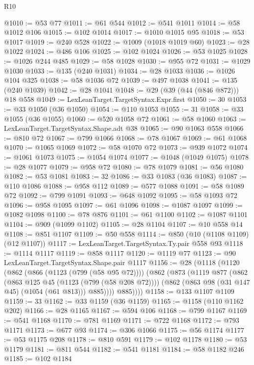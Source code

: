 \begin{lexlean}{R10}
\begin{coremodule}
@1010 := @53 @77
@1011 := @61 @544
@1012 := @541 @1011
@1014 := @58 @1012 @106
@1015 := @102 @1014
@1017 := @1010 @1015 @95
@1018 := @53 @1017
@1019 := @240 @528
@1022 := @1009 (@1018 @1019 @60)
@1023 := @28 @1022
@1024 := @486 @106
@1025 := @102 @1024
@1026 := @53 @1025
@1028 := @1026 @244 @485
@1029 := @58 @1028
@1030 := @955 @72
@1031 := @1029 @1030
@1033 := @135 (@240 @1031)
@1034 := @28 @1033
@1036 := @1026 @104 @325
@1038 := @58 @1036 @72
@1039 := @497 @1038
@1041 := @135 (@240 @1039)
@1042 := @28 @1041
@1048 := @29 (@39 (@44 (@846 @872))) @18 @558
@1049 := LexLeanTarget.TargetSyntax.Expr.first
@1050 := 30
@1053 := @33 @1050 (@36 @1050)
@1054 := @110 @1053
@1055 := 31
@1058 := @33 @1055 (@36 @1055)
@1060 := @520 @1058 @72
@1061 := @58 @1060
@1063 := LexLeanTarget.TargetSyntax.Shape.adt @38
@1065 := @90 @1063 @558
@1066 := @810 @72
@1067 := @799 @1066
@1068 := @78 @1067
@1069 := @61 @1068
@1070 := @1065 @1069
@1072 := @58 @1070 @72
@1073 := @939 @1072
@1074 := @1061 @1073
@1075 := @1054 @1074
@1077 := @1048 (@1049 @1075)
@1078 := @28 @1077
@1079 := @958 @72
@1080 := @78 @1079
@1081 := @56 @1080
@1082 := @53 @1081
@1083 := 32
@1086 := @33 @1083 (@36 @1083)
@1087 := @110 @1086
@1088 := @958 @112
@1089 := @577 @1088
@1091 := @58 @1089 @72
@1092 := @799 @1091
@1093 := @648 @1092
@1095 := @58 @1093 @72
@1096 := @958 @1095
@1097 := @61 @1096
@1098 := @1087 @1097
@1099 := @1082 @1098
@1100 := @78 @876
@1101 := @61 @1100
@1102 := @1087 @1101
@1104 := @909 (@1099 @1102)
@1105 := @28 @1104
@1107 := @10 @558 @14
@1108 := @851 @1107
@1109 := @50 @558
@1114 := @850 (@10 (@1108 @1109) (@12 @1107))
@1117 := LexLeanTarget.TargetSyntax.Ty.pair @558 @93
@1118 := @1114 @1117
@1119 := @858 @1117
@1120 := @1119 @77
@1123 := @90 LexLeanTarget.TargetSyntax.Shape.pair @1117
@1156 := @28
    (@1118
      (@1120
        (@862
          (@866 (@1123 (@799 (@58 @95 @72))))
          (@862
            (@873
              (@1119
                @877
                (@862
                  (@863 @125 @45 (@1123 (@799 (@58 @208 @72))))
                  (@862 (@863 @98 (@31 @147 @45) (@1054 (@61 @813))) @885))))
            @885))))
@1158 := @133 @1107 @1109
@1159 := 33
@1162 := @33 @1159 (@36 @1159)
@1165 := @1158 (@110 @1162 @202)
@1166 := @28 @1165
@1167 := @594 @106
@1168 := @799 @1167
@1169 := @541 @1168
@1170 := @781 @1169
@1171 := @722 @1168
@1172 := @793 @1171
@1173 := @677 @93
@1174 := @306 @1066
@1175 := @56 @1174
@1177 := @53 @1175 @208
@1178 := @810 @591
@1179 := @102 @1178
@1180 := @53 @1179
@1181 := @811 @544
@1182 := @541 @1181
@1184 := @58 @1182 @246
@1185 := @102 @1184

\end{coremodule}
\end{lexlean}
